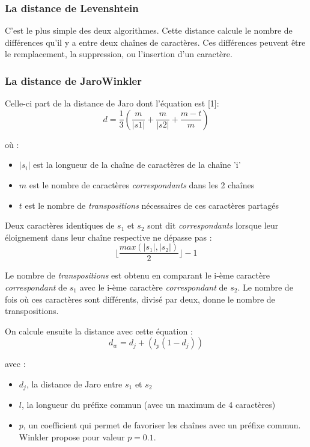     \subsubsection{La distance de Levenshtein}
C'est le plus simple des deux algorithmes. Cette distance calcule le nombre de différences qu'il y a entre deux chaînes de caractères. Ces différences peuvent être le remplacement, la suppression, ou l'insertion d'un caractère.

    \subsubsection{La distance de JaroWinkler} 
Celle-ci part de la distance de Jaro dont l'équation est [1]: 
\begin{equation}
 d = \frac{1}{3}(\frac{m}{|s1|}+\frac{m}{|s2|}+\frac{m-t}{m})
\end{equation}

où :
\begin{itemize}
 \item $|s_i|$ est la longueur de la chaîne de caractères de la chaîne 'i'
 \item $m$ est le nombre de caractères \emph{correspondants} dans les 2 chaînes
 \item $t$ est le nombre de \emph{transpositions} nécessaires de ces caractères partagés
\end{itemize}

Deux caractères identiques de $s_1$ et $s_2$ sont dit \emph{correspondants} lorsque leur éloignement dans 
leur chaîne respective ne dépasse pas :
\begin{equation}
 \lfloor{\frac{max(|s_1|, |s_2|)}{2}}\rfloor - 1
\end{equation}

Le nombre de \emph{transpositions} est obtenu en comparant le i-ème caractère \emph{correspondant} de $s_1$ avec le i-ème caractère \emph{correspondant} de $s_2$. Le nombre de fois où ces caractères sont différents, divisé par deux, donne le nombre de transpositions.

On calcule ensuite la distance avec cette équation :
\begin{equation}
 d_w = d_j + (l_p(1-d_j))
\end{equation}

avec :
\begin{itemize}
 \item $d_j$, la distance de Jaro entre $s_1$ et $s_2$
 \item $l$, la longueur du préfixe commun (avec un maximum de 4 caractères)
 \item $p$, un coefficient qui permet de favoriser les chaînes avec un préfixe commun. Winkler propose 
pour valeur $p=0.1$.

\end{itemize}

